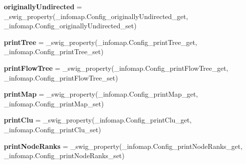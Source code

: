 \begin{DoxyCompactItemize}
\mbox{\label{classdsmacc_1_1graph_1_1infomap_1_1infomap_1_1Config_a13c5b604ef1e72b95b9de75ff8514b68}} 
{\bfseries originally\+Undirected} = \+\_\+swig\+\_\+property(\+\_\+infomap.\+Config\+\_\+originally\+Undirected\+\_\+get, \+\_\+infomap.\+Config\+\_\+originally\+Undirected\+\_\+set)
\item 
\mbox{\label{classdsmacc_1_1graph_1_1infomap_1_1infomap_1_1Config_a038b15c71b027610bf23f6cdb94607ba}} 
{\bfseries print\+Tree} = \+\_\+swig\+\_\+property(\+\_\+infomap.\+Config\+\_\+print\+Tree\+\_\+get, \+\_\+infomap.\+Config\+\_\+print\+Tree\+\_\+set)
\item 
\mbox{\label{classdsmacc_1_1graph_1_1infomap_1_1infomap_1_1Config_a3f2c6015d23494b1c6be8d41968ac5f2}} 
{\bfseries print\+Flow\+Tree} = \+\_\+swig\+\_\+property(\+\_\+infomap.\+Config\+\_\+print\+Flow\+Tree\+\_\+get, \+\_\+infomap.\+Config\+\_\+print\+Flow\+Tree\+\_\+set)
\item 
\mbox{\label{classdsmacc_1_1graph_1_1infomap_1_1infomap_1_1Config_a6766f850e20e1fd18b6605b0ad287c20}} 
{\bfseries print\+Map} = \+\_\+swig\+\_\+property(\+\_\+infomap.\+Config\+\_\+print\+Map\+\_\+get, \+\_\+infomap.\+Config\+\_\+print\+Map\+\_\+set)
\item 
\mbox{\label{classdsmacc_1_1graph_1_1infomap_1_1infomap_1_1Config_a2f64e77fa638c1a18e2b14d49652ed69}} 
{\bfseries print\+Clu} = \+\_\+swig\+\_\+property(\+\_\+infomap.\+Config\+\_\+print\+Clu\+\_\+get, \+\_\+infomap.\+Config\+\_\+print\+Clu\+\_\+set)
\item 
\mbox{\label{classdsmacc_1_1graph_1_1infomap_1_1infomap_1_1Config_a880ee715694a2e73cbbe53fc2efe2b8b}} 
{\bfseries print\+Node\+Ranks} = \+\_\+swig\+\_\+property(\+\_\+infomap.\+Config\+\_\+print\+Node\+Ranks\+\_\+get, \+\_\+infomap.\+Config\+\_\+print\+Node\+Ranks\+\_\+set)
\item 
\mbox{\label{classdsmacc_1_1graph_1_1infomap_1_1infomap_1_1Config_aa2602d14ba8c4bfe20e61f349b167505}} 

\end{DoxyCompactItemize}
